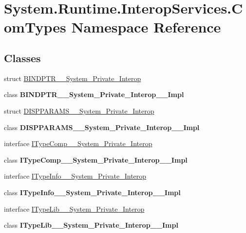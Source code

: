 \hypertarget{namespace_system_1_1_runtime_1_1_interop_services_1_1_com_types}{}\section{System.\+Runtime.\+Interop\+Services.\+Com\+Types Namespace Reference}
\label{namespace_system_1_1_runtime_1_1_interop_services_1_1_com_types}
\subsection*{Classes}
\begin{DoxyCompactItemize}
\item 
struct \hyperlink{struct_system_1_1_runtime_1_1_interop_services_1_1_com_types_1_1_b_i_n_d_p_t_r_____system___private___interop}{B\+I\+N\+D\+P\+T\+R\+\_\+\+\_\+\+System\+\_\+\+Private\+\_\+\+Interop}
\item 
class {\bfseries B\+I\+N\+D\+P\+T\+R\+\_\+\+\_\+\+System\+\_\+\+Private\+\_\+\+Interop\+\_\+\+\_\+\+Impl}
\item 
struct \hyperlink{struct_system_1_1_runtime_1_1_interop_services_1_1_com_types_1_1_d_i_s_p_p_a_r_a_m_s_____system___private___interop}{D\+I\+S\+P\+P\+A\+R\+A\+M\+S\+\_\+\+\_\+\+System\+\_\+\+Private\+\_\+\+Interop}
\item 
class {\bfseries D\+I\+S\+P\+P\+A\+R\+A\+M\+S\+\_\+\+\_\+\+System\+\_\+\+Private\+\_\+\+Interop\+\_\+\+\_\+\+Impl}
\item 
interface \hyperlink{interface_system_1_1_runtime_1_1_interop_services_1_1_com_types_1_1_i_type_comp_____system___private___interop}{I\+Type\+Comp\+\_\+\+\_\+\+System\+\_\+\+Private\+\_\+\+Interop}
\item 
class {\bfseries I\+Type\+Comp\+\_\+\+\_\+\+System\+\_\+\+Private\+\_\+\+Interop\+\_\+\+\_\+\+Impl}
\item 
interface \hyperlink{interface_system_1_1_runtime_1_1_interop_services_1_1_com_types_1_1_i_type_info_____system___private___interop}{I\+Type\+Info\+\_\+\+\_\+\+System\+\_\+\+Private\+\_\+\+Interop}
\item 
class {\bfseries I\+Type\+Info\+\_\+\+\_\+\+System\+\_\+\+Private\+\_\+\+Interop\+\_\+\+\_\+\+Impl}
\item 
interface \hyperlink{interface_system_1_1_runtime_1_1_interop_services_1_1_com_types_1_1_i_type_lib_____system___private___interop}{I\+Type\+Lib\+\_\+\+\_\+\+System\+\_\+\+Private\+\_\+\+Interop}
\item 
class {\bfseries I\+Type\+Lib\+\_\+\+\_\+\+System\+\_\+\+Private\+\_\+\+Interop\+\_\+\+\_\+\+Impl}
\end{DoxyCompactItemize}
